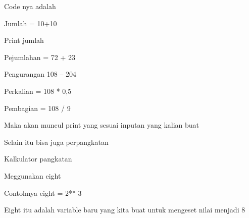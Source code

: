 \vspace{14pt}
\noindent 
{\fontsize{14pt}{14pt}\selectfont Code nya adalah  \\} \par
\vspace{14pt}
\vspace{14pt}
\noindent 
{\fontsize{14pt}{14pt}\selectfont Jumlah = 10+10 \\} \par
\noindent 
{\fontsize{14pt}{14pt}\selectfont Print jumlah \\} \par
\vspace{14pt}
\noindent 
{\fontsize{14pt}{14pt}\selectfont Pejumlahan = 72 + 23 \\} \par
\noindent 
{\fontsize{14pt}{14pt}\selectfont Pengurangan 108 – 204 \\} \par
\noindent 
{\fontsize{14pt}{14pt}\selectfont Perkalian = 108 * 0,5 \\} \par
\noindent 
{\fontsize{14pt}{14pt}\selectfont Pembagian = 108 / 9 \\} \par
\vspace{14pt}
\noindent 
{\fontsize{14pt}{14pt}\selectfont Maka akan muncul print yang sesuai inputan yang kalian buat \\} \par
\vspace{14pt}
\noindent 
{\fontsize{14pt}{14pt}\selectfont Selain itu bisa juga perpangkatan  \\} \par
\noindent 
{\fontsize{14pt}{14pt}\selectfont Kalkulator pangkatan \\} \par
\noindent 
{\fontsize{14pt}{14pt}\selectfont Meggunakan eight \\} \par
\vspace{14pt}
\noindent 
{\fontsize{14pt}{14pt}\selectfont Contohnya eight = 2** 3 \\} \par
\vspace{14pt}
\noindent 
{\fontsize{14pt}{14pt}\selectfont Eight itu adalah variable baru yang kita buat untuk mengeset nilai menjadi 8 \\} \par
\vspace{14pt}
\noindent 
